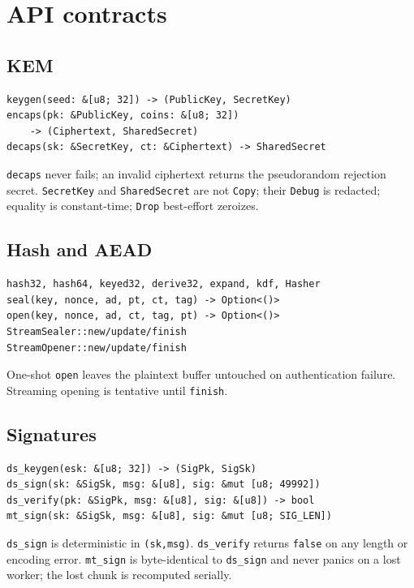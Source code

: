 \documentclass[11pt,a4paper]{article}
\theoremstyle{plain}
\theoremstyle{definition}
\theoremstyle{remark}
\begin{document}
\section{API contracts}
\label{sec:api}

\subsection{KEM}

\begin{verbatim}
keygen(seed: &[u8; 32]) -> (PublicKey, SecretKey)
encaps(pk: &PublicKey, coins: &[u8; 32])
    -> (Ciphertext, SharedSecret)
decaps(sk: &SecretKey, ct: &Ciphertext) -> SharedSecret
\end{verbatim}
\texttt{decaps} never fails; an invalid ciphertext returns the
pseudorandom rejection secret.  \texttt{SecretKey} and
\texttt{SharedSecret} are not \texttt{Copy}; their \texttt{Debug} is
redacted; equality is constant-time; \texttt{Drop} best-effort
zeroizes.

\subsection{Hash and AEAD}

\begin{verbatim}
hash32, hash64, keyed32, derive32, expand, kdf, Hasher
seal(key, nonce, ad, pt, ct, tag) -> Option<()>
open(key, nonce, ad, ct, tag, pt) -> Option<()>
StreamSealer::new/update/finish
StreamOpener::new/update/finish
\end{verbatim}
One-shot \texttt{open} leaves the plaintext buffer untouched on
authentication failure.  Streaming opening is tentative until
\texttt{finish}.

\subsection{Signatures}

\begin{verbatim}
ds_keygen(esk: &[u8; 32]) -> (SigPk, SigSk)
ds_sign(sk: &SigSk, msg: &[u8], sig: &mut [u8; 49992])
ds_verify(pk: &SigPk, msg: &[u8], sig: &[u8]) -> bool
mt_sign(sk: &SigSk, msg: &[u8], sig: &mut [u8; SIG_LEN])
\end{verbatim}
\texttt{ds\_sign} is deterministic in \texttt{(sk,msg)}.
\texttt{ds\_verify} returns \texttt{false} on any length or encoding
error.  \texttt{mt\_sign} is byte-identical to \texttt{ds\_sign} and
never panics on a lost worker; the lost chunk is recomputed serially.
\end{document}
